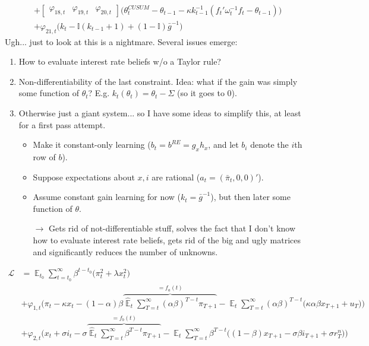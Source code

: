 \documentclass[11pt]{article}
\renewcommand{\[}{\begin{equation}}
\renewcommand{\]}{\end{equation}}
\DeclareMathOperator{\E}{\mathbb{E}}
\begin{document}
\begin{enumerate}
\begin{align}
    & + \begin{bmatrix} \varphi_{18,t} & \varphi_{19,t} & \varphi_{20,t} \end{bmatrix} \bigg( \theta_t^{CUSUM} -  \theta_{t-1} - \kappa k_{t-1}^{-1}(f_t'\omega_t^{-1}f_t -\theta_{t-1}) \bigg)  \\
  & + \varphi_{21,t} \bigg(k_t - \mathbb{I}(k_{t-1} +1) + (1-\mathbb{I})\bar{g}^{-1} \bigg)  
\end{align}
	Ugh... just to look at this is a nightmare. Several issues emerge:
	
	\begin{enumerate}
	\item How to evaluate interest rate beliefs w/o a Taylor rule?
	\item Non-differentiability of the last constraint. Idea: what if the gain was simply some function of $\theta_t$? E.g. $k_t(\theta_t) = \theta_t - \Sigma$ (so it goes to 0).
	\item Otherwise just a giant system... so I have some ideas to simplify this, at least for a first pass attempt.
		\begin{itemize}
		\item Make it constant-only learning ($b_t = b^{RE}= g_x h_x$, and let $b_i$ denote the $i$th row of $b$).
		\item Suppose expectations about $x,i$ are rational ($a_t = (\bar{\pi}_t, 0, 0)'$).
		\item Assume constant gain learning for now ($k_t =\bar{g}^{-1}$), but then later some function of $\theta$.
		\item[$\rightarrow$] Gets rid of not-differentiable stuff, solves the fact that I don't know how to evaluate interest rate beliefs, gets rid of the big and ugly matrices and significantly reduces the number of unknowns.
		\end{itemize}
	\end{enumerate}	
	\begin{align}
\mathcal{L} &= \E_{t_0}\sum_{t=t_0}^{\infty} \beta^{t-t_0}\bigg( \pi_t^2  + \lambda x_t^2 \bigg)  \\
 & + \varphi_{1,t} \bigg(\pi_t - \kappa x_t -(1-\alpha)\beta \overbrace{\hat{\E}_t \sum_{T=t}^{\infty} (\alpha\beta)^{T-t }\pi_{T+1}}^{=f_a(t)} - \E_t \sum_{T=t}^{\infty} (\alpha\beta)^{T-t }\big( \kappa \alpha \beta x_{T+1} + u_T\big)\bigg) \\
 & + \varphi_{2,t} \bigg(x_t + \sigma i_t -\sigma\overbrace{\hat{\E}_t \sum_{T=t}^{\infty} \beta^{T-t }\pi_{T+1}}^{=f_b(t)} -\E_t \sum_{T=t}^{\infty} \beta^{T-t }\big( (1-\beta)x_{T+1} - \sigma\beta i_{T+1} +\sigma r_T^n \big)\bigg) \\

\end{align}
\end{enumerate}
\end{document}
